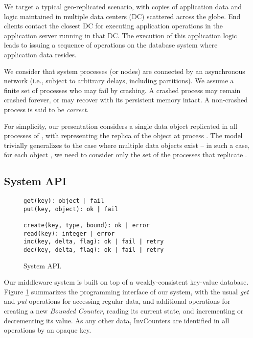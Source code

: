 \documentclass[conference]{IEEEtran}
\newcommand{\InvCounter}{\emph{Bounded Counter}}
\begin{document}
We target a typical geo-replicated scenario, with copies of application data and logic 
maintained in multiple data centers (DC) scattered across the globe.
End clients contact the closest DC for executing application operations in 
the application server running in that DC. 
The execution of this application logic leads to issuing a sequence of operations 
on the database system where application data resides. 

We consider that system processes
(or nodes) are connected by an asynchronous network (i.e., subject to arbitrary
delays, including partitions).
We assume a finite set  of processes who may fail by crashing.
A crashed process may remain crashed forever, or may recover with its persistent memory intact.
A non-crashed process is said to be {\em correct}.

For simplicity, our presentation considers a single data object replicated in all 
processes of , with  representing the replica of the object at process .
The model trivially generalizes to the case where multiple data objects exist -- in 
such a case, for each object , we need to consider only the set  of the processes that replicate .




\subsection{System API}

\begin{figure}[t] 
{\footnotesize \centering
\begin{verbatim}
get(key): object | fail
put(key, object): ok | fail

create(key, type, bound): ok | error
read(key): integer | error
inc(key, delta, flag): ok | fail | retry
dec(key, delta, flag): ok | fail | retry 
\end{verbatim}
\vspace{-2ex}
}
\caption{System API.}
\label{fig:API}
\vspace{-2ex}
\end{figure}

Our middleware system is built on top of a weakly-consistent key-value database. 
Figure \ref{fig:API} summarizes the programming interface of our system, with the
usual \emph{get} and \emph{put} operations for accessing regular data, and additional
operations for creating a new \InvCounter{}, reading its current state, and incrementing 
or decrementing its value.
As any other data, InvCounters{} are identified in all operations by an 
opaque key.
\end{document}
